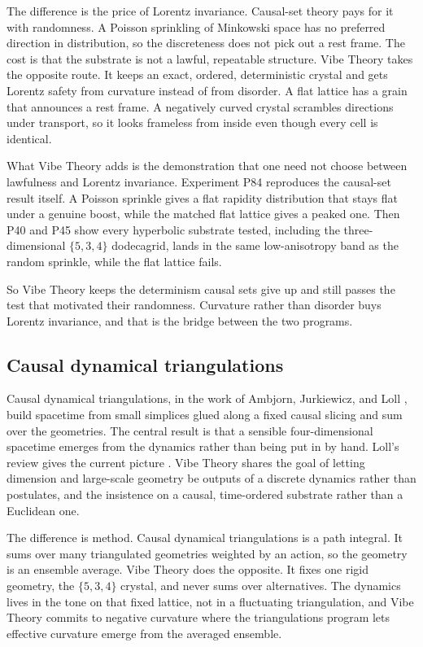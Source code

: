 The difference is the price of Lorentz invariance. Causal-set theory pays for it with randomness. A Poisson
sprinkling of Minkowski space has no preferred direction in distribution, so the discreteness does not pick
out a rest frame. The cost is that the substrate is not a lawful, repeatable structure. Vibe Theory takes the
opposite route. It keeps an exact, ordered, deterministic crystal and gets Lorentz safety from curvature
instead of from disorder. A flat lattice has a grain that announces a rest frame. A negatively curved crystal
scrambles directions under transport, so it looks frameless from inside even though every cell is identical.

What Vibe Theory adds is the demonstration that one need not choose between lawfulness and Lorentz invariance.
Experiment P84 reproduces the causal-set result itself. A Poisson sprinkle gives a flat rapidity distribution
that stays flat under a genuine boost, while the matched flat lattice gives a peaked one. Then P40 and P45
show every hyperbolic substrate tested, including the three-dimensional $\{5,3,4\}$ dodecagrid, lands in the
same low-anisotropy band as the random sprinkle, while the flat lattice fails.

So Vibe Theory keeps the
determinism causal sets give up and still passes the test that motivated their randomness. Curvature rather
than disorder buys Lorentz invariance, and that is the bridge between the two programs.

\subsection{Causal dynamical triangulations}

Causal dynamical triangulations, in the work of Ambjorn, Jurkiewicz, and Loll \cite{ambjorn2004}, build
spacetime from small simplices glued along a fixed causal slicing and sum over the geometries. The central
result is that a sensible four-dimensional spacetime emerges from the dynamics rather than being put in by
hand. Loll's review gives the current picture \cite{loll2019}. Vibe Theory shares the goal of letting
dimension and large-scale geometry be outputs of a discrete dynamics rather than postulates, and the
insistence on a causal, time-ordered substrate rather than a Euclidean one.

The difference is method. Causal dynamical triangulations is a path integral. It sums over many triangulated
geometries weighted by an action, so the geometry is an ensemble average. Vibe Theory does the opposite. It
fixes one rigid geometry, the $\{5,3,4\}$ crystal, and never sums over alternatives. The dynamics lives in
the tone on that fixed lattice, not in a fluctuating triangulation, and Vibe Theory commits to negative
curvature where the triangulations program lets effective curvature emerge from the averaged ensemble.

